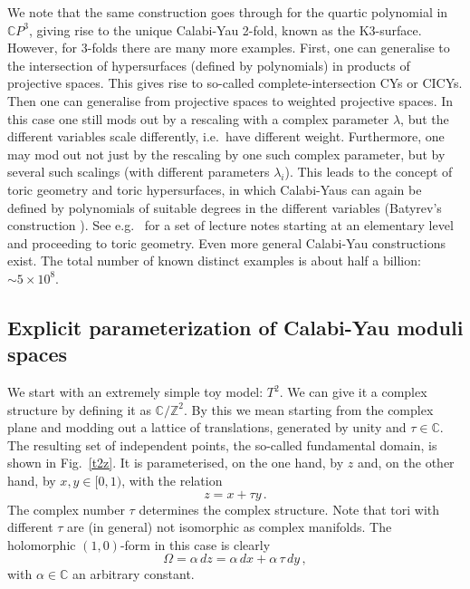 \documentclass[12pt]{article}
\newcommand{\be}{\begin{equation}}
\newcommand{\ee}{\end{equation}}
\numberwithin{equation}{section}
\begin{document}
We note that the same construction goes through for the quartic polynomial in $\mathbb{C}P^3$, giving rise to the unique Calabi-Yau 2-fold, known as the K3-surface. However, for 3-folds there are many more examples. First, one can generalise to the intersection of hypersurfaces (defined by polynomials) in products of projective spaces. This gives rise to so-called complete-intersection CYs or CICYs. Then one can generalise from projective spaces to weighted projective spaces. In this case one still mods out by a rescaling with a complex parameter $\lambda$, but the different variables scale differently, i.e.~have different weight. Furthermore, one may mod out not just by the rescaling by one such complex parameter, but by several such scalings (with different parameters $\lambda_i$). This leads to the concept of toric geometry and toric hypersurfaces, in which Calabi-Yaus can again be defined by polynomials of suitable degrees in the different variables (Batyrev's construction \cite{Batyrev:1994hm}).
See e.g.~\cite{Bouchard:2007ik} for a set of lecture notes starting at an elementary level and proceeding to toric geometry. Even more general Calabi-Yau constructions exist. The total number of known distinct examples is about half a billion: $\sim 5\times 10^8$.







\subsection{Explicit parameterization of Calabi-Yau moduli spaces}\label{epcy}

We start with an extremely simple toy model: $T^2$. We can give it a complex structure by defining it as $\mathbb{C}/\mathbb{Z}^2$. By this we mean starting from the complex plane and modding out a lattice of translations, generated by unity and $\tau\in\mathbb{C}$. The resulting set of independent points, the so-called fundamental domain, is shown in Fig.~\ref{t2z}. It is parameterised, on the one hand, by $z$ and, on the other hand, by $x,y\in [0,1)$, with the relation
\be
z=x+\tau y\,.
\ee
The complex number $\tau$ determines the complex structure. Note that tori with different $\tau$ are (in general) not isomorphic as complex manifolds.
The holomorphic $(1,0)$-form in this case is clearly
\be
\Omega=\alpha\,dz=\alpha\,dx+\alpha\,\tau\,dy\,,
\ee
with $\alpha\in \mathbb{C}$ an arbitrary constant. 
\end{document}
